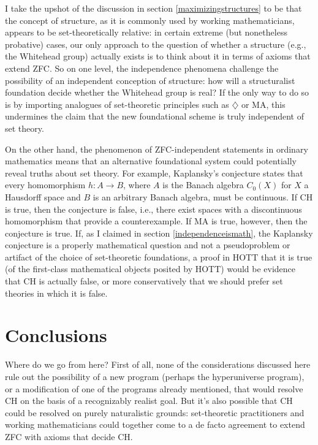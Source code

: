 \documentclass[letterpaper,12pt]{article}
\begin{document}
I take the upshot of the discussion in section \ref{maximizingstructures} to be that the concept of structure, as it is commonly used by working mathematicians, appears to be set-theoretically relative: in certain extreme (but nonetheless probative) cases, our only approach to the question of whether a structure (e.g., the Whitehead group) actually exists is to think about it in terms of axioms that extend ZFC. So on one level, the independence phenomena challenge the possibility of an independent conception of structure: how will a structuralist foundation decide whether the Whitehead group is real? If the only way to do so is by importing analogues of set-theoretic principles such as $\diamondsuit$ or MA, this undermines the claim that the new foundational scheme is truly independent of set theory.


On the other hand, the phenomenon of ZFC-independent statements in ordinary mathematics means that an alternative foundational system could potentially reveal truths about set theory. For example, Kaplansky's conjecture states that every homomorphism $h: A \to B$, where $A$ is the Banach algebra $C_0(X)$ for $X$ a Hausdorff space and $B$ is an arbitrary Banach algebra, must be continuous. If CH is true, then the conjecture is false, i.e., there exist spaces with a discontinuous homomorphism that provide a counterexample. If MA is true, however, then the conjecture is true. If, as I claimed in section \ref{independenceismath}, the Kaplansky conjecture is a properly mathematical question and not a pseudoproblem or artifact of the choice of set-theoretic foundations, a proof in HOTT that it is true (of the first-class mathematical objects posited by HOTT) would be evidence that CH is actually false, or more conservatively that we should prefer set theories in which it is false.

\section{Conclusions}
Where do we go from here? First of all, none of the considerations discussed here rule out the possibility of a new program (perhaps the hyperuniverse program), or a modification of one of the programs already mentioned, that would resolve CH on the basis of a recognizably realist goal. But it's also possible that CH could be resolved on purely naturalistic grounds: set-theoretic practitioners and working mathematicians could together come to a de facto agreement to extend ZFC with axioms that decide CH.
\end{document}
